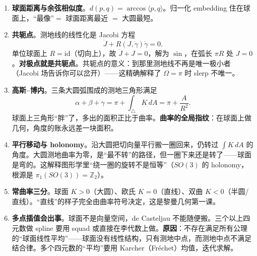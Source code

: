 \begin{enumerate}
  \item \textbf{球面距离与余弦相似度}。$d(p,q)=\arccos\langle p,q\rangle$。归一化 embedding 住在球面上，“最像”$=$ 球面距离最近 $=$ 大圆最短。
  \item \textbf{共轭点}。测地线的线性化是 Jacobi 方程
  \[
  \ddot J+R(J,\dot\gamma)\dot\gamma=0 .
  \]
  单位球面上 $R=\mathrm{id}$（切向上），故 $\ddot J+J=0$，解为 $\sin$，在弧长 $\pi R$ 处 $J=0$。\textbf{对极点就是共轭点}。共轭点的意义：到那里测地线不再是唯一极小者（Jacobi 场告诉你可以岔开）——这精确解释了 $\Omega=\pi$ 时 slerp 不唯一。
  \item \textbf{高斯--博内}。三条大圆弧围成的测地三角形满足
  \[
  \alpha+\beta+\gamma=\pi+\int_\triangle K\,dA=\pi+\frac{A}{R^2}.
  \]
  球面上三角形“胖”了，多出的面积正比于曲率。\textbf{曲率的全局指纹}：在球面上做几何，角度的账永远差一块面积。
  \item \textbf{平行移动与 holonomy}。沿大圆把切向量平行搬一圈回来，仍转过 $\int K\,dA$ 的角度。大圆测地曲率为零，是“最不转”的路径，但一圈下来还是转了——球面是弯的。这解释图形学里“绕一圈的旋转不是恒等”（$SO(3)$ 的 holonomy，根源是 $\pi_1(SO(3))=\mathbb{Z}_2$）。
  \item \textbf{常曲率三分}。球面 $K>0$（大圆）、欧氏 $K=0$（直线）、双曲 $K<0$（半圆/直线）。“直线”的样子完全由曲率符号决定，这是黎曼几何第一课。
  \item \textbf{多点插值会出事}。球面不是向量空间，de Casteljau 不能随便搬。三个以上四元数做 spline 要用 squad 或直接在李代数上做。\textbf{原因}：不存在满足所有公理的“球面线性平均”——球面没有线性结构，只有测地中点，而测地中点不满足结合律。多个四元数的“平均”要用 Karcher（Fréchet）均值，迭代求解。
\end{enumerate}